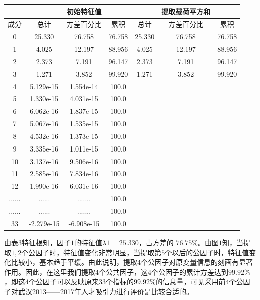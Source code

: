 \documentclass{whutmod}
\begin{document}
		\begin{table}[H]
		\label{biaosan} \centering
		\begin{tabular}{ccccccc}
			\toprule[1.5pt]
		\multicolumn{1}{m{1cm}}{\centering } &
				\multicolumn{1}{m{1.5cm}}{\centering  } &
		 \multicolumn{1}{m{3cm}}{\centering 初始特征值} &
		 		\multicolumn{1}{m{1cm}}{\centering  } &
		\multicolumn{1}{m{1cm}}{\centering  } &
		 \multicolumn{1}{m{3cm}}{\centering 提取载荷平方和}&
		 		\multicolumn{1}{m{1.5cm}}{\centering  } \\\hline
		\multicolumn{1}{m{1cm}}{\centering  成分} &
		\multicolumn{1}{m{1.5cm}}{\centering  总计} &
		\multicolumn{1}{m{2cm}}{\centering  方差百分比} &
		\multicolumn{1}{m{1cm}}{\centering  累积} &
		\multicolumn{1}{m{1cm}}{\centering  总计} &
		\multicolumn{1}{m{3cm}}{\centering  方差百分比} &				\multicolumn{1}{m{1.5cm}}{\centering  累积} \\

			\midrule[1pt]
			0&25.330&76.758&76.758&25.330&76.758&76.758 \\
			1&4.025&12.197&88.956&4.025&12.197&88.956 \\
			2&2.373&7.191&96.147&2.373&7.191&96.147 \\
			3&1.271&3.852&99.920&1.271&3.852&99.920 \\
			4&5.129e-15&1.554e-14&100.0&&& \\
			5&1.330e-15&4.031e-15&100.0&&& \\
			6&6.062e-16&1.837e-15&100.0&&& \\
			7&5.067e-16&1.535e-15&100.0&&& \\
			8&4.532e-16&1.373e-15&100.0&&& \\
			9&3.335e-16&1.011e-15&100.0&&& \\
			10&3.137e-16&9.506e-16&100.0&&& \\
			11&2.585e-16&7.834e-16&100.0&&& \\
			12&1.990e-16&6.031e-16&100.0&&& \\
			......&......&.......&100.0&&& \\
			......&......&.......&100.0&&& \\
			33&-2.279e-15&-6.908e-15&100.0&&& \\
			\bottomrule[1.5pt]
		\end{tabular}
	\end{table}
	
	
	由表$3$特征根知，因子$1$的特征值$λ1=25.330$，占方差的 $76.75\%$。由图$1$知，当提取$1,2$个公因子时，特征值变化非常明显，当提取第$5$个以后的公因子时，特征值变化比较小，基本趋于平缓。由此说明，提取$4$个公因子对原变量信息的刻画有显著作用。因此，在这里我们提取$4$个公共因子，这$4$个公因子的累计方差达到$99.92\%$，即这$4$个公因子可以反映原来$33$个指标的$99.92\%$的信息量，可见采用前$4$个公因子对武汉2013——2017年人才吸引力进行评价是比较合适的。
	
\end{document}
